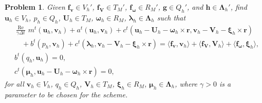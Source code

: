 \documentclass{article}
\newcommand{\bU}{{\mathbf{U}}}
\newcommand{\bu}{{\mathbf{u}}}
\newcommand{\bv}{{\mathbf{v}}}
\newcommand{\bomega}{{\boldsymbol{\omega}}}
\newcommand{\Reynolds}{{\operatorname{Re}}}
\newtheorem{problem}{Problem}
\begin{document}
\begin{problem}
Given ${\mathbf{f}}_\bv\in V_h'$, ${\mathbf{f}}_\mathbf{V}\in T_M'$, ${\mathbf{f}}_\bomega\in R_M'$, ${\mathbf{g}}\in Q_h'$, and ${\mathbf{h}}\in \boldsymbol{\Lambda}_h'$,
find $\bu_h\in V_h$, $p_h\in Q_h$, $\bU_h \in T_M$, $\boldsymbol{\omega}_h\in R_M$, ${\boldsymbol{\lambda}}_h\in \boldsymbol{\Lambda}_h$ such that
\begin{equation}\label{eq:linearised_discretized}
    \begin{aligned}
        &\frac{\Reynolds}{\gamma \Delta t}\, {m}^t({\bu_h}, {\bv}_h) + {a}^t(\bu_h,{\bv}_h) + {c}^t(\bu_h - {\bU}_h - \boldsymbol{\omega}_h\times \mathbf{r},\bv_h - {\mathbf{V}}_h - {\boldsymbol{\xi}}_h\times\mathbf{r}) \\
        &\quad + {b}^t(p_h, {\bv}_h) + {c}^t({\boldsymbol{\lambda}}_h, {\bv}_h - {\mathbf{V}}_h - {\boldsymbol{\xi}}_h\times\mathbf{r}) = \langle{\mathbf{f}}_\bv,{\bv}_h\rangle + \langle{\mathbf{f}}_\mathbf{V},{\mathbf{V}}_h\rangle + \langle{\mathbf{f}}_\bomega,{\boldsymbol{\xi}}_h\rangle, \\
        &{b}^t({q}_h,\bu_h) = 0, \\
        &{c}^t({\boldsymbol{\mu}}_h,\bu_h - \bU_h - \boldsymbol{\omega}_h\times\mathbf{r})  = 0,
    \end{aligned}
\end{equation}
for all ${\bv}_h\in V_h$, ${q}_h\in Q_h$, ${\mathbf{V}}_h \in T_M$, ${\boldsymbol{\xi}}_h\in R_M$, ${\boldsymbol{\mu}}_h\in \boldsymbol{\Lambda}_h$, where $\gamma > 0$ is a parameter to be chosen for the scheme.
\end{problem}
\end{document}
